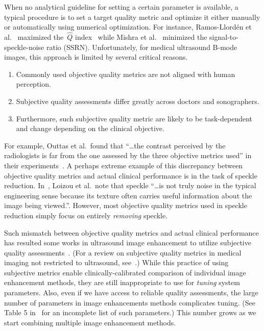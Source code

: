 When no analytical guideline for setting a certain parameter is available, a typical procedure is to set a target quality metric and optimize it either manually or automatically using numerical optimization.
For instance, Ramos-Llord\'en et al.~\cite{ramos-llorden_anisotropic_2015} maximized the~\(\widehat{Q}\) index~\cite{tay_ultrasound_2006} while Mishra et al.~\cite{mishra_edge_2018} minimized the signal-to-speckle-noise ratio (SSRN).
Unfortunately, for medical ultrasound B-mode images, this approach is limited by several critical reasons.
\vspace{0.05in}
\begin{enumerate}
  \item[\ding{228}] Commonly used objective quality metrics are not aligned with human perception.
    \vspace{0.05in}
  \item[\ding{228}] Subjective quality assessments differ greatly across doctors and sonographers.
    \vspace{0.05in}
  \item[\ding{228}] Furthermore, such subjective quality metric are likely to be task-dependent and change depending on the clinical objective.
\end{enumerate}
For example, Outtas et al.~found that ``\ldots the contrast perceived by the radiologists is far from the one assessed by the three objective metrics used'' in their experiments~\cite{outtas_subjective_2018}.
A perhaps extreme example of this discrepancy between objective quality metrics and actual clinical performance is in the task of speckle reduction.
In~\cite{loizou_comparative_2005}, Loizou et al.~note that speckle ``\ldots is not truly noise in the typical engineering sense because its texture often carries useful information about the image being viewed.''.
However, most objective quality metrics used in speckle reduction simply focus on entirely \textit{removing} speckle.

Such mismatch between objective quality metrics and actual clinical performance has resulted some works in ultrasound image enhancement to utilize subjective quality assessments~\cite{loizou_quality_2006, hemmsen_ultrasound_2010, wong_monte_2012, kang_new_2016, mishra_edge_2018}.
(For a review on subjective quality metrics in medical imaging not restricted to ultrasound, see~\cite{chow_review_2016}.)
While this practice of using subjective metrics enable clinically-calibrated comparison of individual image enhancement methods, they are still inappropriate to use for \textit{tuning} system parameters.
Also, even if we have access to reliable quality assessments, the large number of parameters in image enhancements methods complicates tuning.
(See Table 5 in~\cite{finn_echocardiographic_2011} for an incomplete list of such parameters.)
This number grows as we start combining multiple image enhancement methods.


